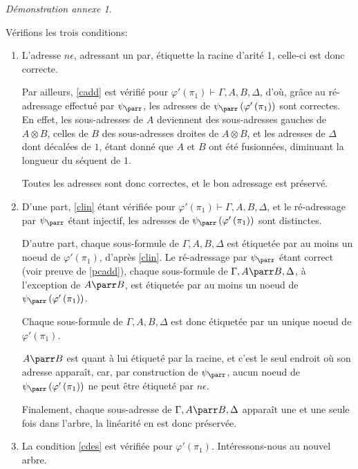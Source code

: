\documentclass[11pt,a4paper]{article}
\theoremstyle{plain}
\theoremstyle{definition}
\theoremstyle{remark}
\newtheorem{demonstrationappendix}{Démonstration annexe}
\newcommand*{\tensor}{\otimes}
\newcommand*{\sequent}{\Gamma}
\newcommand*{\sequentbis}{\Delta}
\newcommand*{\encode}{\ensuremath{\varphi}}
\begin{document}
\begin{demonstrationappendix}
\begin{description}
    Vérifions les trois conditions:
    \begin{enumerate}
        \item\label{pcadd} L'adresse $n \epsilon$, adressant un par, étiquette la racine d'arité 1, celle-ci est donc correcte.
        
        Par ailleurs, \ref{cadd} est vérifié pour $\encode ' \left( \pi_1 \right) \vdash \sequent, A, B, \sequentbis$, d'où, grâce au ré-adressage effectué par $\psi_\parr$, les adresses de $\psi_\parr \left( \encode' \left( \pi_1 \right) \right)$ sont correctes. En effet, les sous-adresses de $A$ deviennent des sous-adresses gauches de $A \tensor B$, celles de $B$ des sous-adresses droites de $A \tensor B$, et les adresses de $\sequentbis$ dont décalées de $1$, étant donné que $A$ et $B$ ont été fusionnées, diminuant la longueur du séquent de $1$.
        
        Toutes les adresses sont donc correctes, et le bon adressage est préservé.
        
        \item D'une part, \ref{clin} étant vérifiée pour $\encode ' \left( \pi_1 \right) \vdash \sequent, A, B, \sequentbis$, et le ré-adressage par $\psi_\parr$ étant injectif, les adresses de $\psi_\parr \left( \encode' \left( \pi_1 \right) \right)$ sont distinctes.
        
        D'autre part, chaque sous-formule de $\sequent, A, B, \sequentbis$ est étiquetée par au moins un noeud de $\encode ' \left( \pi_1 \right)$, d'après \ref{clin}. Le ré-adressage par $\psi_\parr$ étant correct (voir preuve de \ref{pcadd}), chaque sous-formule de $\sequent, A \parr B, \sequentbis$, à l'exception de $A \parr B$, est étiquetée par au moins un noeud de $\psi_\parr \left( \encode' \left( \pi_1 \right) \right)$.
        
        Chaque sous-formule de $\sequent, A, B, \sequentbis$ est donc étiquetée par un unique noeud de $\encode ' \left( \pi_1 \right)$.
        
        $A \parr B$ est quant à lui étiqueté par la racine, et c'est le seul endroit où son adresse apparaît, car, par construction de $\psi_\parr$, aucun noeud de $\psi_\parr \left( \encode' \left( \pi_1 \right) \right)$ ne peut être étiqueté par $n \epsilon$.

        Finalement, chaque sous-adresse de $\sequent, A \parr B, \sequentbis$ apparaît une et une seule fois dans l'arbre, la linéarité en est donc préservée.
        
        \item La condition \ref{cdes} est vérifiée pour $\encode ' \left( \pi_1 \right)$. Intéressons-nous au nouvel arbre.
        

\end{enumerate}
\end{description}
\end{demonstrationappendix}
\end{document}
